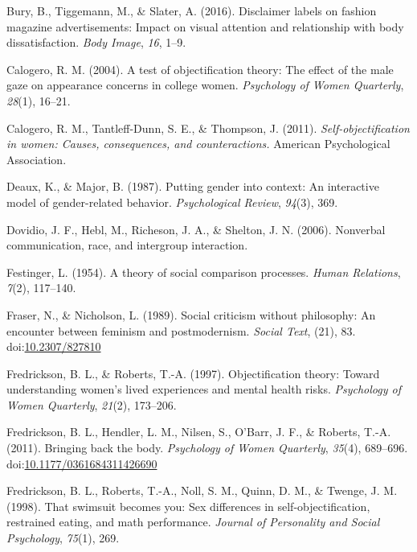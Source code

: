 \documentclass[man]{apa6}
\begin{document}
\hypertarget{ref-bury2016}{}
Bury, B., Tiggemann, M., \& Slater, A. (2016). Disclaimer labels on
fashion magazine advertisements: Impact on visual attention and
relationship with body dissatisfaction. \emph{Body Image}, \emph{16},
1--9.

\hypertarget{ref-calogero2004test}{}
Calogero, R. M. (2004). A test of objectification theory: The effect of
the male gaze on appearance concerns in college women. \emph{Psychology
of Women Quarterly}, \emph{28}(1), 16--21.

\hypertarget{ref-calogero2011}{}
Calogero, R. M., Tantleff-Dunn, S. E., \& Thompson, J. (2011).
\emph{Self-objectification in women: Causes, consequences, and
counteractions.} American Psychological Association.

\hypertarget{ref-deaux1987putting}{}
Deaux, K., \& Major, B. (1987). Putting gender into context: An
interactive model of gender-related behavior. \emph{Psychological
Review}, \emph{94}(3), 369.

\hypertarget{ref-dovidio2006nonverbal}{}
Dovidio, J. F., Hebl, M., Richeson, J. A., \& Shelton, J. N. (2006).
Nonverbal communication, race, and intergroup interaction.

\hypertarget{ref-festinger1954theory}{}
Festinger, L. (1954). A theory of social comparison processes.
\emph{Human Relations}, \emph{7}(2), 117--140.

\hypertarget{ref-frasernicholson1989}{}
Fraser, N., \& Nicholson, L. (1989). Social criticism without
philosophy: An encounter between feminism and postmodernism.
\emph{Social Text}, (21), 83.
doi:\href{https://doi.org/10.2307/827810}{10.2307/827810}

\hypertarget{ref-robertsfredrickson}{}
Fredrickson, B. L., \& Roberts, T.-A. (1997). Objectification theory:
Toward understanding women's lived experiences and mental health risks.
\emph{Psychology of Women Quarterly}, \emph{21}(2), 173--206.

\hypertarget{ref-fredricksonetal2011}{}
Fredrickson, B. L., Hendler, L. M., Nilsen, S., O'Barr, J. F., \&
Roberts, T.-A. (2011). Bringing back the body. \emph{Psychology of Women
Quarterly}, \emph{35}(4), 689--696.
doi:\href{https://doi.org/10.1177/0361684311426690}{10.1177/0361684311426690}

\hypertarget{ref-fredrickson1998swimsuit}{}
Fredrickson, B. L., Roberts, T.-A., Noll, S. M., Quinn, D. M., \&
Twenge, J. M. (1998). That swimsuit becomes you: Sex differences in
self-objectification, restrained eating, and math performance.
\emph{Journal of Personality and Social Psychology}, \emph{75}(1), 269.
\end{document}
